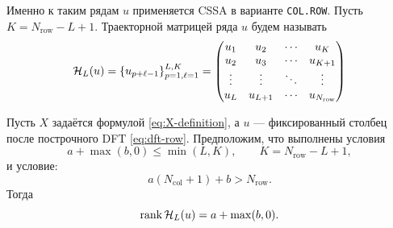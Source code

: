 Именно к таким рядам $u$ применяется CSSA в варианте \texttt{COL.ROW}. Пусть
$K=N_{\mathrm{row}}-L+1$. Траекторной матрицей ряда $u$ будем называть
\begin{equation}
    \mathcal H_L(u)
    =
    \{u_{p+\ell-1}\}_{p=1,\ell=1}^{L,K}
    =
    \begin{pmatrix}
        u_1 & u_2 & \cdots & u_K \\
        u_2 & u_3 & \cdots & u_{K+1} \\
        \vdots & \vdots & \ddots & \vdots \\
        u_L & u_{L+1} & \cdots & u_{N_{\mathrm{row}}}
    \end{pmatrix}
    \label{eq:trajectory-matrix}
\end{equation}

\begin{statement}
\label{st:colrow-main-rank}
Пусть $X$ задаётся формулой \eqref{eq:X-definition}, а $u$ --- фиксированный
столбец после построчного DFT \eqref{eq:dft-row}. Предположим, что выполнены условия
\begin{equation}
    a+\max(b,0)\le \min(L,K),
    \qquad
    K=N_{\mathrm{row}}-L+1,
    \label{eq:rank-fits-window}
\end{equation}
и условие:
\begin{equation}
    a(N_{\mathrm{col}}+1)+b>N_{\mathrm{row}}.
    \label{eq:no-bottom-truncation}
\end{equation}
Тогда
\begin{equation}
    \operatorname{rank} \mathcal H_L(u)
    =
    a+\max(b,0).
    \label{eq:main-rank-formula}
\end{equation}
\end{statement}

